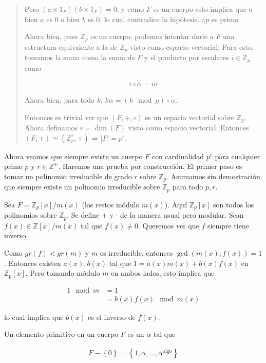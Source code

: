\documentclass[a4paper]{article}
\begin{document}
\begin{quote}
Pero $(a \times 1_F)(b \times 1_F) = 0$, y como $F$ es un cuerpo 
esto implica que o bien $a$ es $0$ o bien $b$ es $0$,
lo cual contradice la hipótesis. $\therefore p$ es primo. 

Ahora bien, pues $\mathbb{Z}_p$ es un cuerpo, podemos intentar darle a $F$ una
estructura equivalente a la de $\mathbb{Z}_p$ visto como espacio vectorial.
Para esto, tomamos la suma como la suma de $F$ y el producto por escalares $i
\in \mathbb{Z}_p$ como

\begin{align*}
    i \circ \alpha = i \alpha
\end{align*}

Ahora bien, para todo $k$, $k \alpha = (k \mod p) \circ \alpha$.

Entonces es trivial ver que $(F, +, \circ)$ es un espacio vectorial sobre
$\mathbb{Z}_p$. Ahora definamos $r = \dim(F)$ visto como espacio 
vectorial. Entonces $(F, +) \simeq (\mathbb{Z}_p^r, +) \Rightarrow |F| = p^r$.

\end{quote}
\normalsize

Ahora veamos que siempre existe un cuerpo $F$ con cardinalidad $p^r$ para
cualquier primo $p$ y $r \in \mathbb{Z}^+$. Haremos una prueba por
construcción. El primer paso es tomar un polinomio irreducible de grado $r$
sobre $\mathbb{Z}_p$. Asumamos sin demostración que siempre existe un polinomio 
irreducible sobre $\mathbb{Z}_p$ para todo $p, r$.

Sea $F = \mathbb{Z}_p[x] / m(x)$ (los restos módulo $m(x)$). Aquí
$\mathbb{Z}_p[x]$ son todos los polinomios sobre $\mathbb{Z}_p$. Se define $+$
y $\cdot$ de la manera usual pero modular. Sean $f(x) \in \mathbb{Z}[x] / m(x)$
tal que $f(x) \neq 0$. Queremos ver que $f$ siempre tiene inverso.

Como $gr(f) < gr(m)$ y $m$ es irreducible, entonces $\gcd\left( m(x), f(x)
\right) = 1$. Entonces existen $a(x), b(x)$ tal que $1 = a(x)m(x) + b(x)f(x)$ en $\mathbb{Z}_p[x]$.
Pero tomando módulo $m$ en ambos lados, esto implica que 

\begin{align*}
    1 \mod m &= 1 \\ 
             &= b(x) f(x) \mod m(x)
\end{align*}

lo cual implica que $b(x)$ es el inverso de $f(x)$.

\begin{definition}
    Un elemento primitivo en un cuerpo $F$ es un $\alpha$ 
    tal que 

    \begin{align*}
        F - \left\{ 0 \right\} = \left\{ 1, \alpha, \ldots, \alpha^\text{algo} \right\} 
    \end{align*}
\end{definition}
\end{document}
